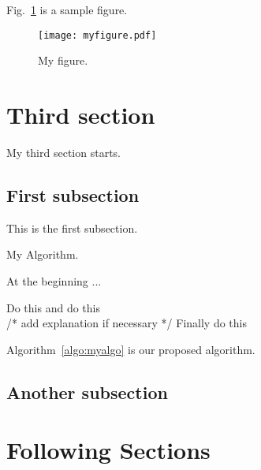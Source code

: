 \documentclass[11pt,a4paper,onecolumn,oneside]{report}
\begin{document}
Fig.~\ref{fig:myfigure} is a sample figure. 

\begin{figure}[h]
\centering
\texttt{[image: myfigure.pdf]}
\caption{My figure.} \label{fig:myfigure}
\end{figure}




\newpage 
\section{Third section} 
My third section starts. 

\subsection{First subsection}
This is the first subsection. 


\begin{algorithm}
	\caption{My Algorithm.} \label{algo:myalgo}
    At the beginning ...
    
	\begin{algorithmic}[1]	    
	    \STATE Do this
        \STATE and do this\\
        /* add explanation if necessary */
        \STATE Finally do this
	\end{algorithmic} 
\end{algorithm}
%
Algorithm~\ref{algo:myalgo} is our proposed algorithm.

\subsection{Another subsection}


\newpage 
\section{Following Sections} 
\end{document}

